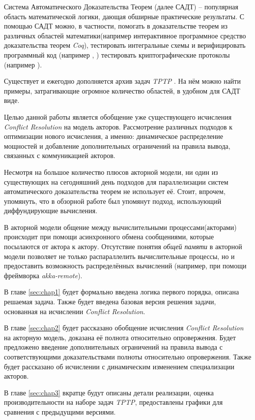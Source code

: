 \startprefacepage

Система Автоматического Доказательства Теорем (далее САДТ) -- популярная область математической логики, дающая обширные практические результаты. С помощью САДТ можно, в частности, помогать в доказательстве теорем из различных областей математики(например интерактивное программное средство доказательства теорем \emph{Coq}), тестировать интегральные схемы и верифицировать программный код (например \cite{Detlefs:2005:STP:1066100.1066102}, \cite{zap-automated-theorem-proving-for-software-analysis}) тестировать криптографические протоколы (например \cite{DBLP:journals/corr/MoranW17}).


Существует и ежегодно дополняется архив задач \emph{TPTP} \cite{Sutcliffe2009}. На нём можно найти примеры, затрагивающие огромное количество областей, в удобном для САДТ виде.


Целью данной работы является обобщение уже существующего исчисления \emph{Conflict Resolution} \cite{DBLP:journals/corr/SlaneyP16} на модель акторов. Рассмотрение различных подходов к оптимизации нового исчисления, а именно: динамическое распределение мощностей и добавление дополнительных ограничений на правила вывода, связанных с коммуникацией акторов.


Несмотря на большое количество плюсов акторной модели, ни один из существующих на сегодняшний день подходов для параллелизации систем автоматического доказательства теорем не использует её. Стоит, впрочем, упомянуть, что в обзорной работе \cite{Bonacina2018} был упомянут подход, использующий диффундирующие вычисления. 

В акторной модели общение между вычислительными процессами(акторами) происходит при помощи асинхронного обмена сообщениями, которые посылаются от актора к актору. Отсутствие понятия \emph{общей памяти} в акторной модели позволяет не только распараллелить вычислительные процессы, но и предоставить возможность распределённых вычислений (например, при помощи фреймворка \emph{akka-remote}).


В главе \ref{sec:chap1} будет формально введена логика первого порядка, описана решаемая задача. Также будет введена базовая версия решения задачи, основанная на исчислении \emph{Conflict Resolution}. 


В главе \ref{sec:chap2} будет рассказано обобщение исчисления \emph{Conflict Resolution} на акторную модель, доказана её полнота относительно опровержения. Будет предложено введение дополнительных ограничений на правила вывода с соответствующими доказательствами полноты относительно опровержения. Также будет рассказано об исчислении с динамическим изменением специализации акторов.

В главе \ref{sec:chap3} вкратце будут описаны детали реализации, оценка производительности на наборе задач \emph{TPTP}, предоставлены графики для сравнения с предыдущими версиями.